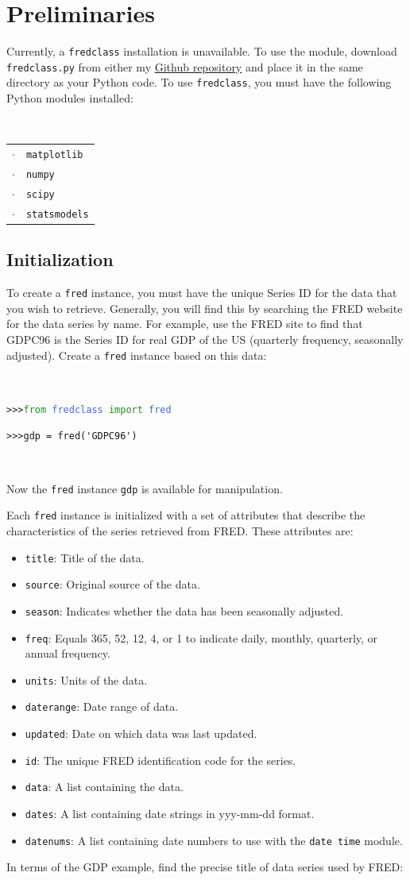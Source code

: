 \documentclass[11pt,fleqn]{article}
\newcommand{\IZ}{\begin{itemize}}
\newcommand{\ZI}{\end{itemize}}
\newcommand{\itemb}{\item[]}
\newcommand{\ttt}{\texttt}
\newcommand{\tc}{\textcolor}
\begin{document}
\section{Preliminaries}

Currently, a \ttt{fredclass} installation is unavailable. To use the module, download \ttt{fredclass.py} from either my \href{https://github.com/letsgoexploring/fredclass}{Github repository} and place it in the same directory as your Python code. To use \ttt{fredclass}, you must have the following Python modules installed:

\

\begin{tabular}{rl} 
 $\cdot$ & \ttt{matplotlib}\\
 $\cdot$ & \ttt{numpy}     \\
 $\cdot$ & \ttt{scipy}     \\ 
 $\cdot$ & \ttt{statsmodels}
\end{tabular}

\subsection{Initialization}

To create a \ttt{fred} instance, you must have the unique Series ID for the data that you wish to retrieve. Generally, you will find this by searching the FRED website for the data series by name. For example, use the FRED site to find that GDPC96 is the Series ID for real GDP of the US (quarterly frequency, seasonally adjusted). Create a \ttt{fred} instance based on this data:

\

\begin{minipage}{6.5in}
\ttt{>>>\tc{ForestGreen}{from} \tc{RoyalBlue}{fredclass} \tc{ForestGreen}{import} \tc{RoyalBlue}{fred}}

\verb!>>>gdp = fred('GDPC96')!
\end{minipage}

\

\noindent Now the \ttt{fred} instance \ttt{gdp} is available for manipulation. 

Each \ttt{fred} instance is initialized with a set of attributes that describe the characteristics of the series retrieved from FRED. These attributes are:
	\IZ
	\itemb \ttt{title}: Title of the data.
	\itemb \ttt{source}: Original source of the data.
	\itemb \ttt{season}: Indicates whether the data has been seasonally adjusted.
	\itemb \ttt{freq}: Equals 365, 52, 12, 4, or 1 to indicate daily, monthly, quarterly, or annual frequency.
	\itemb \ttt{units}: Units of the data.
	\itemb \ttt{daterange}: Date range of data.
	\itemb \ttt{updated}: Date on which data was last updated.
	\itemb \ttt{id}: The unique FRED identification code for the series.
	\itemb \ttt{data}: A list containing the data.
	\itemb \ttt{dates}: A list containing date strings in yyy-mm-dd format.
	\itemb \ttt{datenums}: A list containing date numbers to use with the \ttt{date time} module.
	\ZI
In terms of the GDP example, find the precise title of data series used by FRED:
\end{document}
